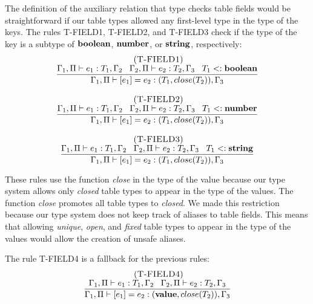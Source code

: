 The definition of the auxiliary relation that type checks table
fields would be straightforward if our table types allowed any
first-level type in the type of the keys.
The rules \textsc{T-FIELD1}, \textsc{T-FIELD2}, and \textsc{T-FIELD3}
check if the type of the key is a subtype of $\mathbf{boolean}$, $\mathbf{number}$,
or $\mathbf{string}$, respectively:
\[
\begin{array}{c}
\begin{array}{c}
\; (\textsc{T-FIELD1})\\
\dfrac{\Gamma_{1}, \Pi \vdash e_{1}:T_{1}, \Gamma_{2} \;\;\;
       \Gamma_{2}, \Pi \vdash e_{2}:T_{2}, \Gamma_{3} \;\;\;
       T_{1} <: \mathbf{boolean}}
      {\Gamma_{1}, \Pi \vdash [e_{1}] = e_{2}: (T_{1},close(T_{2})), \Gamma_{3}}
\end{array}
\\ \\
\begin{array}{c}
\; (\textsc{T-FIELD2})\\
\dfrac{\Gamma_{1}, \Pi \vdash e_{1}:T_{1}, \Gamma_{2} \;\;\;
       \Gamma_{2}, \Pi \vdash e_{2}:T_{2}, \Gamma_{3} \;\;\;
       T_{1} <: \mathbf{number}}
      {\Gamma_{1}, \Pi \vdash [e_{1}] = e_{2}: (T_{1},close(T_{2})), \Gamma_{3}}
\end{array}
\\ \\
\begin{array}{c}
\; (\textsc{T-FIELD3})\\
\dfrac{\Gamma_{1}, \Pi \vdash e_{1}:T_{1}, \Gamma_{2} \;\;\;
       \Gamma_{2}, \Pi \vdash e_{2}:T_{2}, \Gamma_{3} \;\;\;
       T_{1} <: \mathbf{string}}
      {\Gamma_{1}, \Pi \vdash [e_{1}] = e_{2}: (T_{1},close(T_{2})), \Gamma_{3}}
\end{array}
\end{array}
\]

These rules use the function \emph{close} in the type of the value
because our type system allows only \emph{closed} table types to
appear in the type of the values.
The function \emph{close} promotes all table types to \emph{closed}.
We made this restriction because our type system does not keep track
of aliases to table fields.
This means that allowing \emph{unique}, \emph{open}, and \emph{fixed}
table types to appear in the type of the values would allow the creation
of unsafe aliases.

The rule \textsc{T-FIELD4} is a fallback for the previous rules:
\[
\begin{array}{c}
\; (\textsc{T-FIELD4})\\
\dfrac{\Gamma_{1}, \Pi \vdash e_{1}:T_{1}, \Gamma_{2} \;\;\;
       \Gamma_{2}, \Pi \vdash e_{2}:T_{2}, \Gamma_{3}}
      {\Gamma_{1}, \Pi \vdash [e_{1}] = e_{2}: (\mathbf{value},close(T_{2})), \Gamma_{3}}
\end{array}
\]

